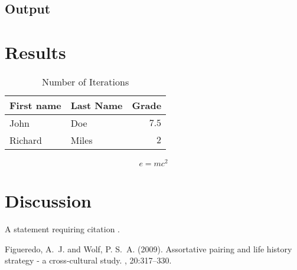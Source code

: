 \documentclass[twoside,twocolumn]{article}
\begin{document}
\subsection{Output}

\section{Results}

\begin{table}
\caption{Number of Iterations}
\centering
\begin{tabular}{llr}
\toprule
First name & Last Name & Grade \\
\midrule
John & Doe & $7.5$ \\
Richard & Miles & $2$ \\
\bottomrule
\end{tabular}
\end{table}


\begin{equation}
\label{eq:emc}
e = mc^2
\end{equation}



\section{Discussion}
A statement requiring citation \cite{Figueredo:2009dg}.


\begin{thebibliography}{99} %

Figueredo, A.~J. and Wolf, P. S.~A. (2009).
\newblock Assortative pairing and life history strategy - a cross-cultural
  study.
, 20:317--330.
 
\end{thebibliography}

\end{document}
